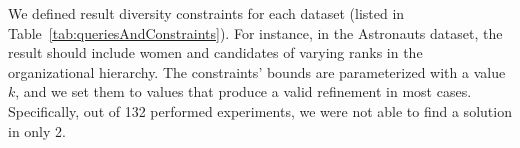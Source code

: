      
     
     We defined result diversity constraints for each dataset (listed in Table~\ref{tab:queriesAndConstraints}). For instance, in the Astronauts dataset, the result should include women and candidates of varying ranks in the organizational hierarchy. The constraints' bounds are parameterized with a value $k$, and we set them to values that produce a valid refinement in most cases. Specifically, out of 132 performed experiments, we were not able to find a solution in only 2. 
     

